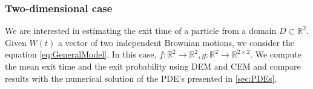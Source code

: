 \subsubsection{Two-dimensional case}
We are interested in estimating the exit time of a particle from a domain $D\subset\mathbb{R}^2$. Given $W(t)$ a  vector of two independent Brownian motions, we consider the equation \eqref{eq:GeneralModel}. In this case, $f\colon \mathbb{R}^2 \rightarrow \mathbb{R}^2, g\colon \mathbb{R}^2 \rightarrow \mathbb{R}^{2\times 2}$. We compute the mean exit time and the exit probability using DEM and CEM and compare results with the numerical solution of the PDE's presented in \ref{sec:PDEs}.





